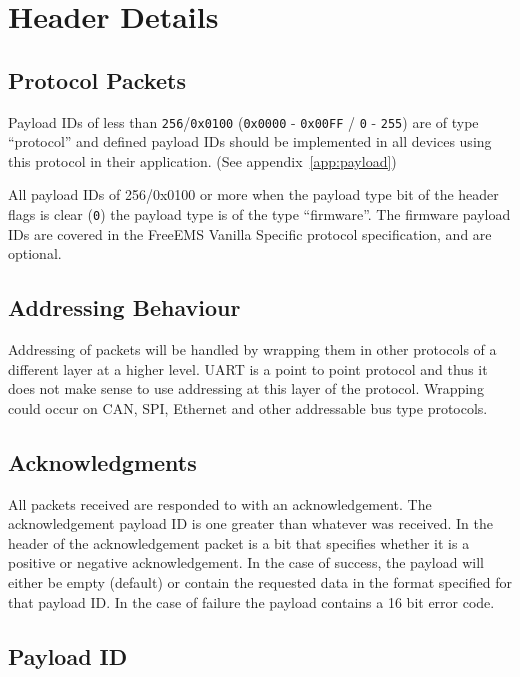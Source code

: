 \documentclass[12pt,a4paper,titlepage]{article}
\begin{document}
\section{Header Details}

\subsection{Protocol Packets}

Payload IDs of less than \texttt{256}/\texttt{0x0100} (\texttt{0x0000} -
\texttt{0x00FF} / \texttt{0} - \texttt{255}) are of type ``protocol'' and
defined payload IDs should be implemented in all devices using this protocol in
their application. (See appendix~\ref{app:payload})

All payload IDs of 256/0x0100 or more when the payload type bit of the header
flags is clear (\texttt{0}) the payload type is of the type ``firmware''. The firmware
payload IDs are covered in the FreeEMS Vanilla Specific protocol specification,
and are optional.

\subsection{Addressing Behaviour}

Addressing of packets will be handled by wrapping them in other protocols of
a different layer at a higher level. UART is a point to point protocol and
thus it does not make sense to use addressing at this layer of the protocol.
Wrapping could occur on CAN, SPI, Ethernet and other addressable bus type
protocols.

\subsection{Acknowledgments}

All packets received are responded to with an acknowledgement. The
acknowledgement payload ID is one greater than whatever was received. In the
header of the acknowledgement packet is a bit that specifies whether it is a
positive or negative acknowledgement. In the case of success, the payload will
either be empty (default) or contain the requested data in the format specified
for that payload ID. In the case of failure the payload contains a 16 bit error
code.

\subsection{Payload ID}
\end{document}
